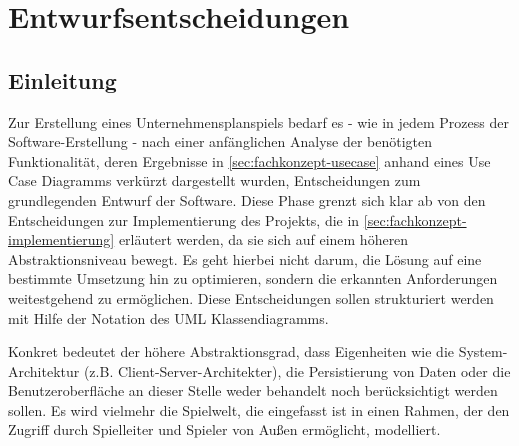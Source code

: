 \section{Entwurfsentscheidungen}
\label{sec:fachkonzept-entwurf}

\subsection{Einleitung}
Zur Erstellung eines Unternehmensplanspiels bedarf es - wie in jedem Prozess der Software-Erstellung - nach einer anfänglichen Analyse der benötigten Funktionalität, deren Ergebnisse in \ref{sec:fachkonzept-usecase} anhand eines Use Case Diagramms verkürzt dargestellt wurden, Entscheidungen zum grundlegenden Entwurf der Software. Diese Phase grenzt sich klar ab von den Entscheidungen zur Implementierung des Projekts, die in \ref{sec:fachkonzept-implementierung} erläutert werden, da sie sich auf einem höheren Abstraktionsniveau bewegt. Es geht hierbei nicht darum, die Lösung auf eine bestimmte Umsetzung hin zu optimieren, sondern die erkannten Anforderungen weitestgehend zu ermöglichen. Diese Entscheidungen sollen strukturiert werden mit Hilfe der Notation des UML Klassendiagramms.

Konkret bedeutet der höhere Abstraktionsgrad, dass Eigenheiten wie die System-Architektur (z.B. Client-Server-Architekter), die Persistierung von Daten oder die Benutzeroberfläche an dieser Stelle weder behandelt noch berücksichtigt werden sollen. Es wird vielmehr die Spielwelt, die eingefasst ist in einen Rahmen, der den Zugriff durch Spielleiter und Spieler von Außen ermöglicht, modelliert.

